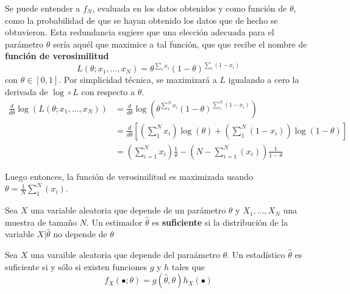 Se puede entender a $f_N$, evaluada en los datos obtenidos y como función de $\theta$, como la probabilidad de que se hayan obtenido los datos que de hecho se obtuvieron.
%
Esta redundancia sugiere que una elección adecuada para el parámetro $\theta$ sería aquél que maximice a tal función, que que recibe el nombre de \textbf{función de verosimilitud}
\begin{equation}
L(\theta; x_1, \dots, x_N) = \theta^{\sum_i x_i}(1-\theta)^{\sum_i(1-x_i)}
\end{equation}
con $\theta \in [0, 1]$. Por simplicidad técnica, se maximizará a $L$ igualando a cero la derivada de $\log \circ L$ con respecto a $\theta$.
\begin{align*}
\frac{d}{d\theta} \log\left( L(\theta; x_1, \dots, x_N)\right)
&= 
\frac{d}{d\theta} \log\left(\theta^{\sum_1^{N} x_i}(1-\theta)^{\sum_1^{N}(1-x_i)}\right) \\
&=
\frac{d}{d\theta} \left[ \left( \sum_{1}^{N} x_i \right) \log(\theta) + 
\left( \sum_{1}^{N}(1-x_i) \right) \log (1-\theta)\right] \\
&= \left( \sum_{i=1}^{N} x_i \right) \frac{1}{\theta} -
\left( N - \sum_{i=1}^{N}(x_i) \right) \frac{1}{1-\theta}
\end{align*}

Luego entonces, la función de verosimilitud es maximizada usando $\theta = \frac{1}{N} \sum_{1}^{N}(x_i)$.

\begin{definicion}
Sea $X$ una variable aleatoria que depende de un parámetro $\theta$ y $X_1, \dots, X_N$ una muestra de tamaño $N$. Un estimador $\widehat{\theta}$ es \textbf{suficiente} si
la distribución de la variable $X \lvert \widehat{\theta}$ no depende de $\theta$
\end{definicion}

\begin{teorema}
Sea $X$ una varaible aleatoria que depende del paraámetro $\theta$. Un estadístico $\widehat{\theta}$ es suficiente si y sólo si existen funciones $g$ y $h$ tales que
\begin{equation}
f_X(\bullet; \theta ) = g(\widehat{\theta},\theta) h_X(\bullet)
\end{equation}
\end{teorema}



